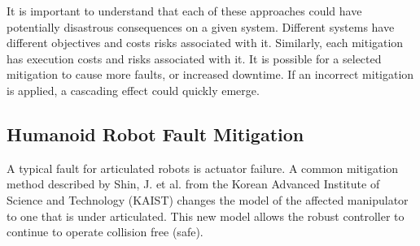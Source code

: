 It is important to understand that each of these approaches could have potentially disastrous consequences on a given system. Different systems have different objectives and costs risks associated with it. Similarly, each mitigation has execution costs and risks associated with it. It is possible for a selected mitigation to cause more faults, or increased downtime. If an incorrect mitigation is applied, a cascading effect could quickly emerge.


\subsection{Humanoid Robot Fault Mitigation}\label{sub:humanoidRobotFaultMitigation}

A typical fault for articulated robots is actuator failure.  A common mitigation method described by Shin, J. et al.\cite{772398} from the Korean Advanced Institute of Science and Technology (KAIST) changes the model of the affected manipulator to one that is under articulated.  This new model allows the robust controller to continue to operate collision free (safe).


